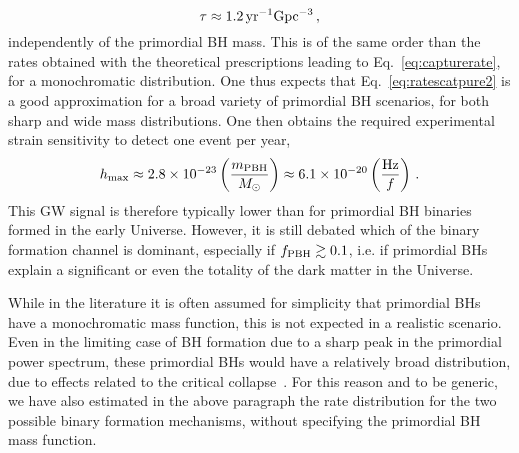 \documentclass[11pt,a4paper]{article}
\newcommand{\be}{\begin{equation}}
\newcommand{\ee}{\end{equation}}
\begin{document}
\begin{enumerate}
    \be
    \tau \approx 1.2 \, \rm{yr^{-1}Gpc^{-3}} \,,
    \ee
    independently of the primordial BH mass. This is of the same order than the rates obtained with the theoretical prescriptions leading to Eq.~\eqref{eq:capturerate}, for a monochromatic distribution. One thus expects that Eq.~\eqref{eq:ratescatpure2} is a good approximation for a broad variety of primordial BH scenarios, for both sharp and wide mass distributions. One then obtains the required experimental strain sensitivity to detect one event per year,
    \be
    h_{\rm max}  \approx 2.8 \times 10^{-23}  \left(\frac{m_{\rm PBH}}{M_\odot}\right) \approx 6.1 \times 10^{-20} \left( \frac{\rm Hz}{f} \right) \,.
    \ee
     This GW signal is therefore typically lower than for primordial BH binaries formed in the early Universe.  However, it is still debated which of the binary formation channel is dominant, especially if $f_{\rm PBH} \gtrsim 0.1$, i.e. if primordial BHs explain a significant or even the totality of the dark matter in the Universe.
\end{enumerate}
While in the literature it is often assumed for simplicity that primordial BHs have a monochromatic mass function, this is not expected in a realistic scenario. Even in the limiting case of BH formation due to a sharp peak in the primordial power spectrum, these primordial BHs would have a relatively broad distribution, due to effects related to the critical collapse~\cite{Musco:2008hv,Musco:2012au}.  For this reason and to be generic, we have also estimated in the above paragraph the rate distribution for the two possible binary formation mechanisms, without specifying the primordial BH mass function.
\end{document}
